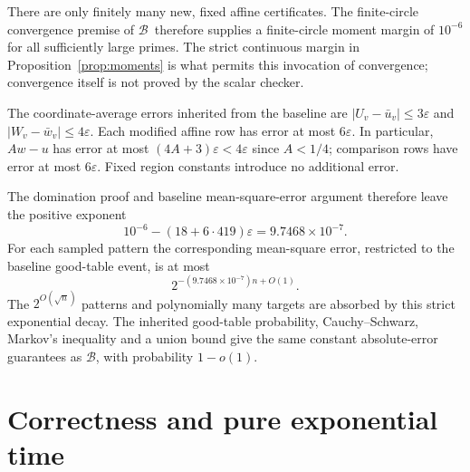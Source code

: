 \documentclass[11pt,a4paper]{article}
\theoremstyle{remark}
\newcommand{\Base}{\ensuremath{\mathcal{B}}}
\newcommand{\eps}{\varepsilon}
\begin{document}
There are only finitely many new, fixed affine certificates. The
finite-circle convergence premise of \Base\ therefore supplies a
finite-circle moment margin of $10^{-6}$ for all sufficiently large
primes. The strict continuous margin in
Proposition~\ref{prop:moments} is what permits this invocation of
convergence; convergence itself is not proved by the scalar checker.

The coordinate-average errors inherited from the baseline are
$|U_v-\bar u_v|\le3\eps$ and $|W_v-\bar w_v|\le4\eps$.
Each modified affine row has error at most $6\eps$. In particular,
$Aw-u$ has error at most $(4A+3)\eps<4\eps$ since $A<1/4$;
comparison rows have error at most $6\eps$. Fixed region constants
introduce no additional error.

The domination proof and baseline mean-square-error argument therefore
leave the positive exponent
\begin{equation}
\label{eq:error-exponent}
 10^{-6}-(18+6\cdot419)\eps
 =9.7468\times10^{-7}.
\end{equation}
For each sampled pattern the corresponding mean-square error, restricted
to the baseline good-table event, is at most
\[
 2^{-(9.7468\times10^{-7})n+O(1)}.
\]
The $2^{O(\sqrt n)}$ patterns and polynomially many targets are absorbed
by this strict exponential decay. The inherited good-table probability,
Cauchy--Schwarz, Markov's inequality and a union bound give the same
constant absolute-error guarantees as \Base, with probability $1-o(1)$.

\section{Correctness and pure exponential time}
\label{sec:time}
\end{document}
